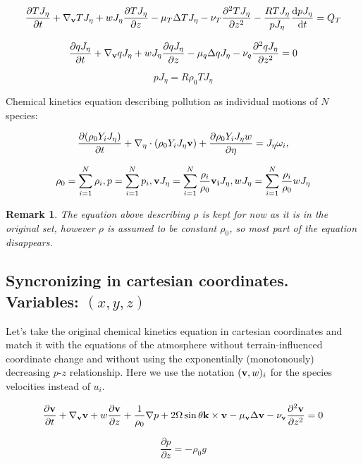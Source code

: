 \documentclass{article}
\newtheorem*{remark}{Remark}
\begin{document}
\[ \frac{\partial T J_{\eta}}{\partial t} + \nabla_{\bold{v}} T J_{\eta} + w J_{\eta} \frac{\partial T J_{\eta}}{\partial z} - \mu_T \Delta T J_{\eta} -\nu_T \frac{\partial^2 T J_{\eta}}{\partial z^2} -\frac{RT J_{\eta}}{p J_{\eta}} \frac{\mathrm{d}p J_{\eta}}{\mathrm{d}t} = Q_T \]

\[ \frac{\partial q J_{\eta}}{\partial t} + \nabla_{\bold{v}}q J_{\eta}+ w J_{\eta} \frac{\partial q J_{\eta}}{\partial z} - \mu_q \Delta q J_{\eta} - \nu_q \frac{\partial ^2 q J_{\eta}}{\partial z^2} = 0 \]

\[ p J_{\eta} = R \rho_0 T J_{\eta}\]

Chemical kinetics equation describing pollution as individual motions of $N$ species:

\[ \frac{\partial(\rho_0 Y_i J_{\eta})}{\partial t} + \nabla_{\eta} \cdot (\rho_0 Y_i J_{\eta} \bold{v}) + \frac{\partial \rho_0 Y_i J_{\eta} w}{\partial \eta} = J_{\eta} \omega_i, \]

\[ \rho_0 = \sum_{i =1}^{N} \rho_i, p = \sum_{i =1}^{N} p_i, \bold{v}J_{\eta} = \sum_{i =1}^{N}\frac{\rho_i}{\rho_0} \bold{v_i}J_{\eta},w J_{\eta} = \sum_{i =1}^{N}\frac{\rho_i}{\rho_0} w J_{\eta} \]

\begin{remark}
The equation above describing $\rho$ is kept for now as it is in the original set, however $\rho$ is assumed to be constant $\rho_0$, so most part of the equation disappears.
\end{remark}

\subsection{Syncronizing in cartesian coordinates. Variables: $(x,y,z)$}

Let's take the original chemical kinetics equation in cartesian coordinates and match it with the equations of the atmosphere without terrain-influenced coordinate change and without using the exponentially (monotonously) decreasing $p$-$z$ relationship. Here we use the notation $(\bold{v}, w)_i$ for the species velocities instead of $u_i$.

\[ \frac{\partial \bold{v} }{\partial t} + \nabla_{\bold{v}}\bold{v} + w  \frac{\partial \bold{v} }{\partial z} + \frac{1}{\rho_0}\nabla p + 2 \Omega \sin \theta \bold{k} \times \bold{v}  -\mu_{\bold{v}}\Delta \bold{v}  -\nu_{\bold{v}} \frac{\partial ^ 2 \bold{v} }{\partial z^2} = 0  \]

\[ \frac{\partial p }{\partial z} = - \rho_0 g \]
\end{document}
